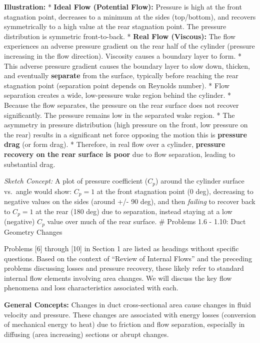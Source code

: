 \textbf{Illustration:} * \textbf{Ideal Flow (Potential Flow):} Pressure
is high at the front stagnation point, decreases to a minimum at the
sides (top/bottom), and recovers symmetrically to a high value at the
rear stagnation point. The pressure distribution is symmetric
front-to-back. * \textbf{Real Flow (Viscous):} The flow experiences an
adverse pressure gradient on the rear half of the cylinder (pressure
increasing in the flow direction). Viscosity causes a boundary layer to
form. * This adverse pressure gradient causes the boundary layer to slow
down, thicken, and eventually \textbf{separate} from the surface,
typically before reaching the rear stagnation point (separation point
depends on Reynolds number). * Flow separation creates a wide,
low-pressure wake region behind the cylinder. * Because the flow
separates, the pressure on the rear surface does not recover
significantly. The pressure remains low in the separated wake region. *
The asymmetry in pressure distribution (high pressure on the front, low
pressure on the rear) results in a significant net force opposing the
motion this is \textbf{pressure drag} (or form drag). * Therefore, in
real flow over a cylinder, \textbf{pressure recovery on the rear surface
is poor} due to flow separation, leading to substantial drag.

\emph{Sketch Concept:} A plot of pressure coefficient (\(C_p\)) around
the cylinder surface vs.~angle would show: \(C_p=1\) at the front
stagnation point (0 deg), decreasing to negative values on the sides
(around +/- 90 deg), and then \emph{failing} to recover back to
\(C_p=1\) at the rear (180 deg) due to separation, instead staying at a
low (negative) \(C_p\) value over much of the rear surface. \# Problems
1.6 - 1.10: Duct Geometry Changes

Problems {[}6{]} through {[}10{]} in Section 1 are listed as headings
without specific questions. Based on the context of ``Review of Internal
Flows'' and the preceding problems discussing losses and pressure
recovery, these likely refer to standard internal flow elements
involving area changes. We will discuss the key flow phenomena and loss
characteristics associated with each.

\textbf{General Concepts:} Changes in duct cross-sectional area cause
changes in fluid velocity and pressure. These changes are associated
with energy losses (conversion of mechanical energy to heat) due to
friction and flow separation, especially in diffusing (area increasing)
sections or abrupt changes.

